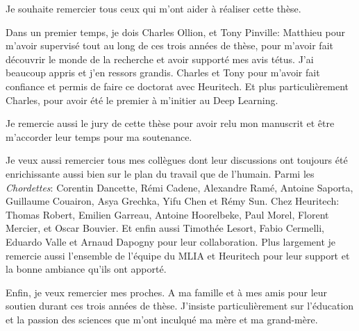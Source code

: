 
Je souhaite remercier tous ceux qui m'ont aider à réaliser cette thèse.

Dans un premier temps, je dois Charles Ollion, et Tony Pinville: Matthieu pour m'avoir supervisé tout
au long de ces trois années de thèse, pour m'avoir fait découvrir le monde de la recherche et avoir
supporté mes avis tétus. J'ai beaucoup appris et j'en ressors grandis. Charles et Tony pour m'avoir
fait confiance et permis de faire ce doctorat avec Heuritech. Et plus particulièrement Charles, pour
avoir été le premier à m'initier au Deep Learning.

Je remercie aussi le jury de cette thèse pour avoir relu mon manuscrit et être m'accorder leur temps
pour ma soutenance.

Je veux aussi remercier tous mes collègues dont leur discussions ont toujours été enrichissante
aussi bien sur le plan du travail que de l'humain. Parmi les \textit{Chordettes}: Corentin Dancette,
Rémi Cadene, Alexandre Ramé, Antoine Saporta, Guillaume Couairon, Asya Grechka, Yifu Chen et Rémy
Sun. Chez Heuritech: Thomas Robert, Emilien Garreau, Antoine Hoorelbeke, Paul Morel, Florent
Mercier, et Oscar Bouvier. Et enfin aussi Timothée Lesort, Fabio Cermelli, Eduardo Valle et Arnaud
Dapogny pour leur collaboration. Plus largement je remercie aussi l'ensemble de l'équipe du MLIA et
Heuritech pour leur support et la bonne ambiance qu'ils ont apporté.

Enfin, je veux remercier mes proches. A ma famille et à mes amis pour leur soutien durant ces trois
années de thèse. J'insiste particulièrement sur l'éducation et la passion des sciences que m'ont
inculqué ma mère et ma grand-mère.


